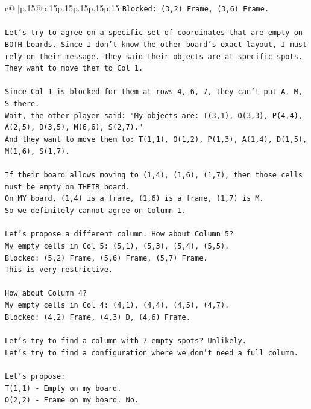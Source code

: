 \documentclass{article}
\begin{document}
{\begin{supertabular}{c@{$\;$}|p{.15\linewidth}@{}p{.15\linewidth}p{.15\linewidth}p{.15\linewidth}p{.15\linewidth}p{.15\linewidth}}
{{{\texttt{Blocked: (3,2) Frame, (3,6) Frame.} \\
\\ 
\texttt{Let's try to agree on a specific set of coordinates that are empty on BOTH boards. Since I don't know the other board's exact layout, I must rely on their message. They said their objects are at specific spots. They want to move them to Col 1.} \\
\\ 
\texttt{Since Col 1 is blocked for them at rows 4, 6, 7, they can't put A, M, S there.} \\
\texttt{Wait, the other player said: "My objects are: T(3,1), O(3,3), P(4,4), A(2,5), D(3,5), M(6,6), S(2,7)."} \\
\texttt{And they want to move them to: T(1,1), O(1,2), P(1,3), A(1,4), D(1,5), M(1,6), S(1,7).} \\
\\ 
\texttt{If their board allows moving to (1,4), (1,6), (1,7), then those cells must be empty on THEIR board.} \\
\texttt{On MY board, (1,4) is a frame, (1,6) is a frame, (1,7) is M.} \\
\texttt{So we definitely cannot agree on Column 1.} \\
\\ 
\texttt{Let's propose a different column. How about Column 5?} \\
\texttt{My empty cells in Col 5: (5,1), (5,3), (5,4), (5,5).} \\
\texttt{Blocked: (5,2) Frame, (5,6) Frame, (5,7) Frame.} \\
\texttt{This is very restrictive.} \\
\\ 
\texttt{How about Column 4?} \\
\texttt{My empty cells in Col 4: (4,1), (4,4), (4,5), (4,7).} \\
\texttt{Blocked: (4,2) Frame, (4,3) D, (4,6) Frame.} \\
\\ 
\texttt{Let's try to find a column with 7 empty spots? Unlikely.} \\
\texttt{Let's try to find a configuration where we don't need a full column.} \\
\\ 
\texttt{Let's propose:} \\
\texttt{T(1,1) {-} Empty on my board.} \\
\texttt{O(2,2) {-} Frame on my board. No.} \\
}}}
\end{supertabular}}
\end{document}
